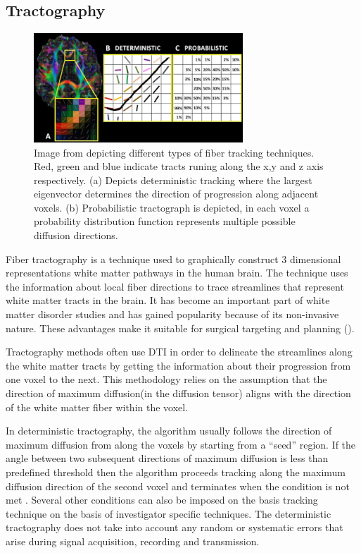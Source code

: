 \documentclass[msthesis.tex]{subfiles}
\begin{document}
\subsection{Tractography}
\label{subsub:tractography}
\begin{figure}
    \centering
    \includegraphics[width=0.7\textwidth]{images/A-Degree-of-anisotropy-B-Deterministic-fiber-tracking-the-fiber-path-across-voxels-is.png}
    \caption{Image from \cite{muller2018clinically} depicting different types of fiber tracking techniques. Red, green and blue indicate tracts runing along the x,y and z axis respectively. (a) Depicts deterministic tracking where the largest eigenvector determines the direction of progression along adjacent voxels. (b) Probabilistic tractograph is depicted, in each voxel a probability distribution function represents multiple possible diffusion directions.}
    \label{fig:tracking}
\end{figure}
Fiber tractography is a technique used to graphically construct  3 dimensional representations white matter pathways in the human brain. The technique uses the information about local fiber directions to trace streamlines that represent white matter tracts in the brain. It has become an important part of white matter disorder studies and has gained popularity because of its non-invasive nature. These advantages make it suitable for surgical targeting and planning (\cite{romano2009pre}).

Tractography methods often use DTI in order to delineate the streamlines along the white matter tracts by getting the information about their progression from one voxel to the next. This methodology relies on the assumption that the direction of maximum diffusion(in the diffusion tensor) aligns with the direction of the white matter fiber within the voxel. 

In deterministic tractography, the algorithm usually follows the direction of maximum diffusion from along the voxels by starting from a “seed” region. If the angle between two subsequent directions of maximum diffusion is less than predefined threshold then the algorithm proceeds tracking along the maximum diffusion direction of the second voxel and terminates when the condition is not met \cite{}.  Several other conditions can also be imposed on the basis tracking technique on the basis of investigator specific techniques. The deterministic tractography does not take into account any random or systematic errors that arise during signal acquisition, recording and transmission.
\end{document}
